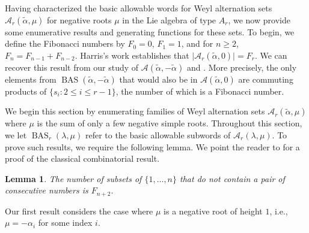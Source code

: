 \documentclass{amsart}
\newtheorem{lemma}[theorem]{Lemma}
\theoremstyle{definition}
\DeclareMathOperator{\BAS}{BAS}
\newcommand{\hroot}{\tilde{\alpha}}
\newcommand{\calA}{\mathcal{A}}
\begin{document}
 Having characterized the basic allowable words for Weyl alternation sets $\calA_r(
 \hroot,\mu
 )$ for negative roots $\mu$ in the Lie algebra of type $A_r$, we now provide some enumerative results and generating functions for these sets.
 To begin, we define the Fibonacci numbers by $F_0 = 0$, $F_1 = 1$, and for $n \geq 2$, $F_n = F_{n-1} + F_{n-2}$. 
Harris's work \cite[Theorem 1.2]{PHThesisPublication} establishes that $\vert \mathcal{A}_r(\hroot,0) \vert = F_r$. 
 We can recover this result from our study of $\mathcal{A}(\hroot,-\hroot)$ and . 
  More precisely, the only elements from $\BAS(\hroot,-\hroot)$ that would also be in $\mathcal{A}(\hroot,0)$ are commuting products of $\{s_i: 2 \leq i \leq r-1\}$, the number of which is a Fibonacci number. 

We begin this section by enumerating families of Weyl alternation sets $\mathcal{A}_r(\hroot, \mu)$ where $\mu$ is the sum of only a few negative simple roots.
Throughout this section, we let $\BAS_r(\lambda,\mu)$ refer to the basic allowable subwords of $\mathcal{A}_r(\lambda,\mu)$. To prove such results, we require the following lemma. We point the reader to \cite[Proposition 2.3]{Harry} for a proof of the classical combinatorial result.

\begin{lemma}\label{lem:CountFibThings}
The number of subsets of $\{1,\ldots,n\}$ that do not contain a pair of consecutive numbers is $F_{n+2}$.
\end{lemma}

Our first result considers the case where $\mu$ is a negative root of height $1$, i.e., $\mu = -\alpha_i$ for some index $i$. 
\end{document}
